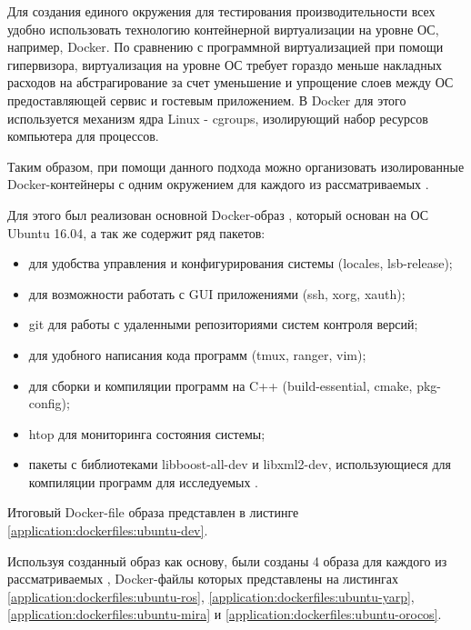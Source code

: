 Для создания единого окружения для тестирования производительности всех \marm{} удобно использовать технологию контейнерной виртуализации на уровне ОС, например, Docker. По сравнению с программной виртуализацией при помощи гипервизора, виртуализация на уровне ОС требует гораздо меньше накладных расходов на абстрагирование за счет уменьшение и упрощение слоев между ОС предоставляющей сервис и гостевым приложением. В Docker для этого используется механизм ядра Linux - cgroups, изолирующий набор ресурсов компьютера для процессов. 

Таким образом, при помощи данного подхода можно организовать изолированные Docker-контейнеры с одним окружением для каждого из рассматриваемых \marm{}.

Для этого был реализован основной Docker-образ , который основан на ОС Ubuntu 16.04, а так же содержит ряд пакетов:
\begin{itemize}[noitemsep]
	\item для удобства управления и конфигурирования системы (locales, lsb-release);
	\item для возможности работать с GUI приложениями (ssh, xorg, xauth);
	\item git для работы с удаленными репозиториями систем контроля версий;
	\item для удобного написания кода программ (tmux, ranger, vim);
	\item для сборки и компиляции программ на C++ (build-essential, cmake, pkg-config);
	\item htop для мониторинга состояния системы;
	\item пакеты с библиотеками libboost-all-dev и libxml2-dev, использующиеся для компиляции программ для исследуемых \marm{}.
\end{itemize}

Итоговый Docker-file образа  представлен в листинге \ref{application:dockerfiles:ubuntu-dev}.

Используя созданный образ как основу, были созданы 4 образа для каждого из рассматриваемых \marm{}, Docker-файлы которых представлены на листингах \ref{application:dockerfiles:ubuntu-ros}, \ref{application:dockerfiles:ubuntu-yarp}, \ref{application:dockerfiles:ubuntu-mira} и \ref{application:dockerfiles:ubuntu-orocos}. 

